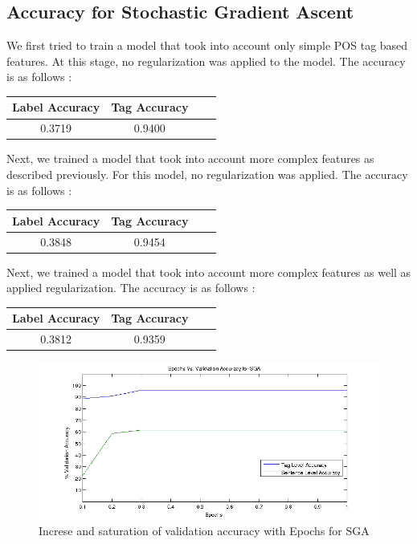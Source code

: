 \documentclass[11pt,a4paper,oneside]{article}
\begin{document}
\subsection{Accuracy for Stochastic Gradient Ascent}
We first tried to train a model that took into account only simple POS tag based features. At this stage, no regularization was applied to the model. The accuracy is as follows :

\begin{center}
\begin{tabular}{|c|c|c|c|}
\hline
Label Accuracy & Tag Accuracy\\\hline
0.3719	& 0.9400\\\hline
\end{tabular}
\end{center}

Next, we trained a model that took into account more complex features as described previously. For this model, no regularization was applied. The accuracy is as follows :
\begin{center}
\begin{tabular}{|c|c|c|c|}
\hline
Label Accuracy & Tag Accuracy\\\hline
0.3848	& 0.9454\\\hline
\end{tabular}
\end{center}

Next, we trained a model that took into account more complex features as well as applied regularization. The accuracy is as follows :
\begin{center}
\begin{tabular}{|c|c|c|c|}
\hline
Label Accuracy & Tag Accuracy\\\hline
0.3812	& 0.9359\\\hline
\end{tabular}
\end{center}

\begin{figure}[H]
\centering
\includegraphics[width=\columnwidth]{EpochsVsValidationAccuracySGA}
\caption{Increse and saturation of validation accuracy with Epochs for SGA}
\label{fig:EpochsVsValidationAccuracySGA}
\end{figure}
\end{document}
